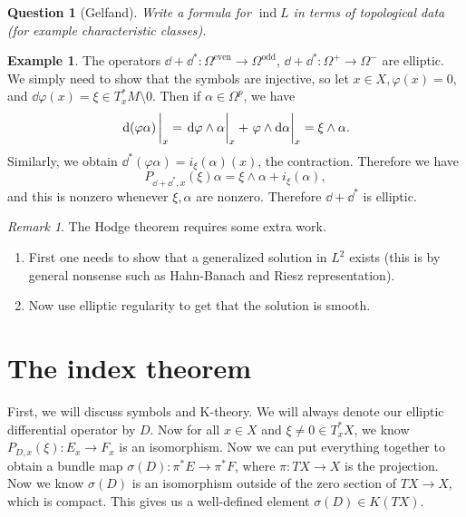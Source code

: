 \documentclass[leqno, openany]{memoir}
\newtheorem{quest}[thm]{Question}
\theoremstyle{definition}
\newtheorem{exm}[thm]{Example}
\theoremstyle{remark}
\newtheorem{rmk}[thm]{Remark}
\theoremstyle{plain}
\theoremstyle{definition}
\theoremstyle{remark}
\DeclareMathOperator{\ind}{ind}
\begin{document}
\begin{quest}[Gelfand] Write a formula for $\ind L$ in terms of topological
data (for example characteristic classes).  \end{quest}

\begin{exm} The operators $\dd + \dd^* \colon \Omega^{\text{even}} \to
    \Omega^{\text{odd}}$, $\dd + \dd^* \colon \Omega^+ \to \Omega^-$ are
    elliptic. We simply need to show that the symbols are injective, so let $x
    \in X, \varphi(x) = 0$, and $\dd \varphi(x) = \xi \in T_x^* M \setminus
    \qty{0}$. Then if $\alpha \in \Omega^p$, we have \[ \eval{\dd{(\varphi
    \alpha)}}_x = \eval{\dd \varphi \wedge \alpha}_x + \eval{\varphi \wedge \dd
    \alpha}_x = \xi \wedge \alpha. \] Similarly, we obtain $\dd^*(\varphi
    \alpha) = i_{\xi}(\alpha) (x)$, the contraction. Therefore we have \[
    P_{\dd + \dd^*, x}(\xi) \alpha = \xi \wedge \alpha + i_{\xi}(\alpha), \]
    and this is nonzero whenever $\xi, \alpha$ are nonzero. Therefore $\dd +
    \dd^*$ is elliptic.  \end{exm}

\begin{rmk} The Hodge theorem requires some extra work.  \begin{enumerate}
    \item First one needs to show that a generalized solution in $L^2$ exists
        (this is by general nonsense such as Hahn-Banach and Riesz
        representation).  \item Now use elliptic regularity to get that the
        solution is smooth.  \end{enumerate} \end{rmk}

\section{The index theorem}%

First, we will discuss symbols and K-theory. We will always denote our elliptic
differential operator by $D$. Now for all $x \in X$ and $\xi \neq 0 \in T_x^*
X$, we know $P_{D,x}(\xi) \colon E_x \to F_x$ is an isomorphism. Now we can put
everything together to obtain a bundle map $\sigma(D) \colon \pi^* E \to \pi^*
F$, where $\pi \colon TX \to X$ is the projection. Now we know $\sigma(D)$ is
an isomorphism outside of the zero section of $TX \to X$, which is compact.
This gives us a well-defined element $\sigma(D) \in K(TX)$.
\end{document}
